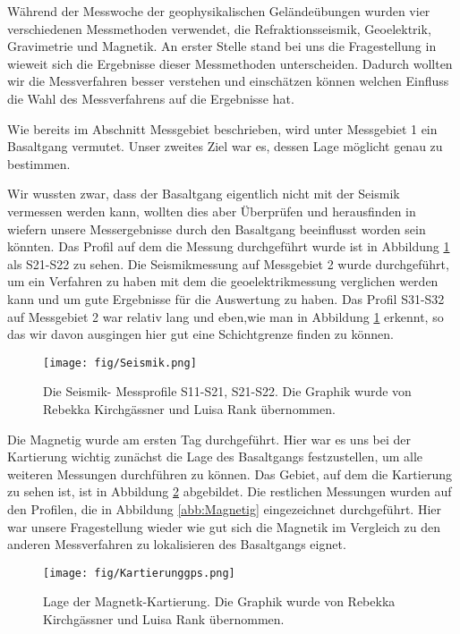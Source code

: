 Während der Messwoche der geophysikalischen Geländeübungen wurden vier verschiedenen Messmethoden verwendet, die Refraktionsseismik, Geoelektrik, Gravimetrie und Magnetik. An erster Stelle stand bei
uns die Fragestellung in wieweit sich die Ergebnisse dieser Messmethoden unterscheiden. Dadurch wollten wir die Messverfahren besser verstehen und einschätzen können welchen Einfluss die Wahl des Messverfahrens auf die Ergebnisse hat.

Wie bereits im Abschnitt Messgebiet beschrieben, wird unter Messgebiet 1 ein Basaltgang vermutet. Unser zweites Ziel war es, dessen Lage möglicht genau zu bestimmen. 


Wir wussten zwar, dass der Basaltgang eigentlich nicht mit der Seismik vermessen werden kann,
wollten dies aber Überprüfen und herausfinden in wiefern unsere Messergebnisse durch den Basaltgang beeinflusst worden sein könnten. Das Profil auf dem die Messung durchgeführt wurde ist in 
Abbildung \ref{abb:Seismik} als S21-S22 zu sehen.
Die Seismikmessung auf Messgebiet 2 wurde durchgeführt, um ein Verfahren zu haben mit dem die geoelektrikmessung verglichen werden kann und um gute Ergebnisse für die Auswertung zu haben.
Das Profil S31-S32 auf Messgebiet 2 war relativ lang und eben,wie man in Abbildung \ref{abb:Seismik} erkennt, so das wir davon ausgingen hier gut eine Schichtgrenze finden zu können.

\begin{figure}
 \centering
 \texttt{[image: fig/Seismik.png]}
 \caption[Die Seismik- Messprofile S11-S21, S21-S22]{Die Seismik- Messprofile S11-S21, S21-S22. Die Graphik wurde von Rebekka Kirchgässner und Luisa Rank übernommen.}
 \label{abb:Seismik}
\end{figure}

Die Magnetig wurde am ersten Tag durchgeführt. Hier war es uns bei der Kartierung wichtig zunächst die Lage des Basaltgangs festzustellen, um alle weiteren Messungen durchführen zu können.
Das Gebiet, auf dem die Kartierung zu sehen ist, ist in Abbildung \ref{abb:Kart} abgebildet. Die restlichen Messungen wurden auf den Profilen, die in Abbildung \ref{abb:Magnetig} eingezeichnet durchgeführt.
Hier war unsere Fragestellung wieder wie gut sich die Magnetik im Vergleich zu den anderen Messverfahren zu lokalisieren des Basaltgangs eignet.

\begin{figure}
 \centering
 \texttt{[image: fig/Kartierunggps.png]}
 \caption[Lage der Magnetk-Kartierung]{Lage der Magnetk-Kartierung. Die Graphik wurde von Rebekka Kirchgässner und Luisa Rank übernommen.}
 \label{abb:Kart}
\end{figure}

